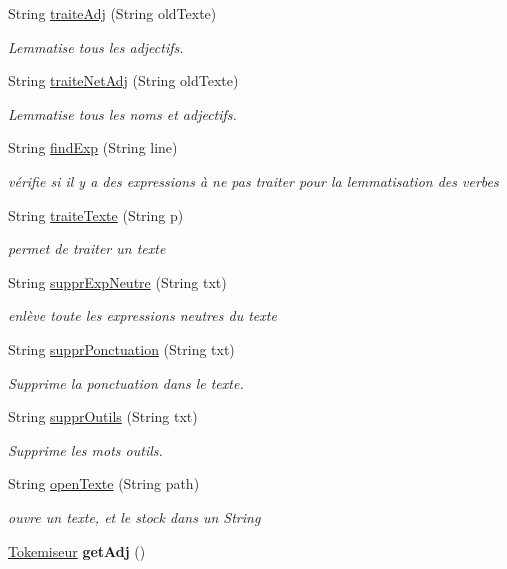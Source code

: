 \begin{DoxyCompactItemize}
String \hyperlink{classlemmatiseur_1_1_lefff_a960e92d433f0ebf28b7d26fc35412547}{traite\+Adj} (String old\+Texte)
\begin{DoxyCompactList}\small\item\em Lemmatise tous les adjectifs. \end{DoxyCompactList}\item 
String \hyperlink{classlemmatiseur_1_1_lefff_a7772cc31ac1855fdf7080b886b23e393}{traite\+Net\+Adj} (String old\+Texte)
\begin{DoxyCompactList}\small\item\em Lemmatise tous les noms et adjectifs. \end{DoxyCompactList}\item 
String \hyperlink{classlemmatiseur_1_1_lefff_abf6050c2918c16ed1f6372bf53c635e6}{find\+Exp} (String line)
\begin{DoxyCompactList}\small\item\em vérifie si il y a des expressions à ne pas traiter pour la lemmatisation des verbes \end{DoxyCompactList}\item 
String \hyperlink{classlemmatiseur_1_1_lefff_a891e9578b68da3429b50ae8790b15ae5}{traite\+Texte} (String p)
\begin{DoxyCompactList}\small\item\em permet de traiter un texte \end{DoxyCompactList}\item 
String \hyperlink{classlemmatiseur_1_1_lefff_aefe143c79c4a9d5b47d7e0737a08b53b}{suppr\+Exp\+Neutre} (String txt)
\begin{DoxyCompactList}\small\item\em enlève toute les expressions neutres du texte \end{DoxyCompactList}\item 
String \hyperlink{classlemmatiseur_1_1_lefff_a74b4ed0aa991795fe7850cf1180205d6}{suppr\+Ponctuation} (String txt)
\begin{DoxyCompactList}\small\item\em Supprime la ponctuation dans le texte. \end{DoxyCompactList}\item 
String \hyperlink{classlemmatiseur_1_1_lefff_acb0f198179d03c9dfdf1fe42ed73d867}{suppr\+Outils} (String txt)
\begin{DoxyCompactList}\small\item\em Supprime les mots outils. \end{DoxyCompactList}\item 
String \hyperlink{classlemmatiseur_1_1_lefff_a0246160e048988e6b027facca5cc4400}{open\+Texte} (String path)
\begin{DoxyCompactList}\small\item\em ouvre un texte, et le stock dans un String \end{DoxyCompactList}\item 
\hyperlink{classtokemisation_1_1_tokemiseur}{Tokemiseur} {\bfseries get\+Adj} ()\hypertarget{classlemmatiseur_1_1_lefff_ac22071c1aa33ecad84d6032887ea5372}{}\label{classlemmatiseur_1_1_lefff_ac22071c1aa33ecad84d6032887ea5372}


\end{DoxyCompactItemize}
